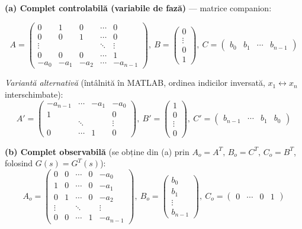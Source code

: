 \documentclass[10pt,a4paper]{article}
\begin{document}
\textbf{(a) Complet controlabilă (variabile de fază)} — matrice companion:
\begin{keyeq}\color{red!65!black}
$$A=\begin{pmatrix}0&1&0&\cdots&0\\0&0&1&\cdots&0\\\vdots&&&\ddots&\vdots\\0&0&0&\cdots&1\\-a_0&-a_1&-a_2&\cdots&-a_{n-1}\end{pmatrix},\ B=\begin{pmatrix}0\\\vdots\\0\\1\end{pmatrix},\ C=\begin{pmatrix}b_0&b_1&\cdots&b_{n-1}\end{pmatrix}$$
\end{keyeq}
\textit{Variantă alternativă} (întâlnită în MATLAB, ordinea indicilor inversată, $x_1\!\leftrightarrow\! x_n$ interschimbate):
$$A'=\begin{pmatrix}-a_{n-1}&\cdots&-a_1&-a_0\\1&&&0\\&\ddots&&\vdots\\0&\cdots&1&0\end{pmatrix},\ B'=\begin{pmatrix}1\\0\\\vdots\\0\end{pmatrix},\ C'=\begin{pmatrix}b_{n-1}&\cdots&b_1&b_0\end{pmatrix}$$

\textbf{(b) Complet observabilă} (se obține din (a) prin $A_o=A^T,\,B_o=C^T,\,C_o=B^T$, folosind $G(s)=G^T(s)$):
$$A_o=\begin{pmatrix}0&0&\cdots&0&-a_0\\1&0&\cdots&0&-a_1\\0&1&\cdots&0&-a_2\\\vdots&&\ddots&&\vdots\\0&0&\cdots&1&-a_{n-1}\end{pmatrix},\ B_o=\begin{pmatrix}b_0\\b_1\\\vdots\\b_{n-1}\end{pmatrix},\ C_o=\begin{pmatrix}0&\cdots&0&1\end{pmatrix}$$
\end{document}
